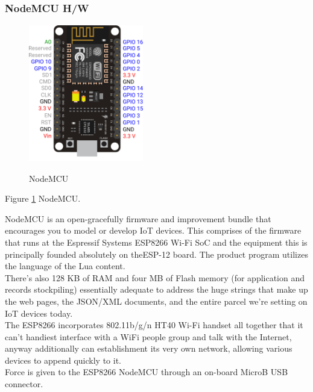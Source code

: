 \documentclass[12pt,a4paper]{article}
\begin{document}
\subsubsection{NodeMCU H/W}

\begin{figure}[H]
	\centering
	\includegraphics[width=5cm, height=6cm]{NodeMCU.png}\\
	\caption{NodeMCU}
	\label{fig:4.3.1}
\end{figure}
\begin{center}
Figure \ref{fig:4.3.1} NodeMCU.
\end{center}


\hspace{0.5cm} NodeMCU is an open-gracefully firmware and improvement bundle that encourages you to model or develop IoT devices. This comprises of the firmware that runs at the Espressif Systems ESP8266 Wi-Fi SoC and the equipment this is principally founded absolutely on theESP-12 board. The product program utilizes the language of the Lua content. \\

\hspace{0.5cm} There's also 128 KB of RAM and four MB of Flash memory (for application and records stockpiling) essentially adequate to address the huge strings that make up the web pages, the JSON/XML documents, and the entire parcel we're setting on IoT devices today. \\

\hspace{0.5cm} The ESP8266 incorporates 802.11b/g/n HT40 Wi-Fi handset all together that it can't handiest interface with a WiFi people group and talk with the Internet, anyway additionally can establishment its very own network, allowing various devices to append quickly to it. \\

\hspace{0.5cm} Force is given to the ESP8266 NodeMCU through an on-board MicroB USB connector.\\
\end{document}
